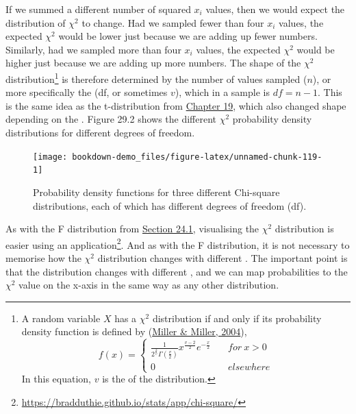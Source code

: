 \documentclass[
  openany]{krantz}
\begin{document}
If we summed a different number of squared \(x_{i}\) values, then we would expect the distribution of \(\chi^{2}\) to change.
Had we sampled fewer than four \(x_{i}\) values, the expected \(\chi^{2}\) would be lower just because we are adding up fewer numbers.
Similarly, had we sampled more than four \(x_{i}\) values, the expected \(\chi^{2}\) would be higher just because we are adding up more numbers.
The shape of the \(\chi^{2}\) distribution\footnote{A random variable \(X\) has a \(\chi^{2}\) distribution if and only if its probability density function is defined by (\protect\hyperlink{ref-Miller2004}{Miller \& Miller, 2004}), \[f(x) = \left\{\begin{array}{ll}\frac{1}{2^{\frac{2}{v}}\Gamma\left(\frac{v}{2}\right)}x^{\frac{v-2}{2}}e^{-\frac{x}{2}} & \quad for\:x > 0 \\ 0 & \quad elsewhere \end{array}\right.\] In this equation, \(v\) is the  of the distribution.} is therefore determined by the number of values sampled (\(n\)), or more specifically the  (df, or sometimes \(v\)), which in a sample is \(df = n - 1\).
This is the same idea as the t-distribution from \protect\hyperlink{Chapter_19}{Chapter 19}, which also changed shape depending on the .
Figure 29.2 shows the different \(\chi^{2}\) probability density distributions for different degrees of freedom.

\begin{figure}
\texttt{[image: bookdown-demo\_files/figure-latex/unnamed-chunk-119-1]} \caption{Probability density functions for three different Chi-square distributions, each of which has different degrees of freedom (df).}\label{fig:unnamed-chunk-119}
\end{figure}

As with the F distribution from \protect\hyperlink{the-f-distribution}{Section 24.1}, visualising the \(\chi^{2}\) distribution is easier using an  application\footnote{\url{https://bradduthie.github.io/stats/app/chi-square/}}.
And as with the F distribution, it is not necessary to memorise how the \(\chi^{2}\) distribution changes with different .
The important point is that the distribution changes with different , and we can map probabilities to the \(\chi^{2}\) value on the x-axis in the same way as any other distribution.
\end{document}
